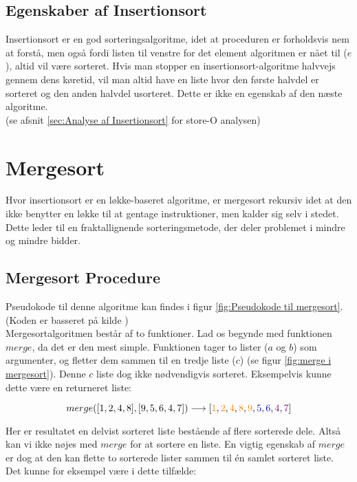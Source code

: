 \subsection{Egenskaber af Insertionsort}%
\label{sub:Egenskaber af Insertionsort}
Insertionsort er en god sorteringsalgoritme, idet at proceduren er forholdsvis nem at forstå, men også fordi listen til venstre for det element algoritmen er nået til ($e$), altid vil være sorteret. Hvis man stopper en insertionsort-algoritme halvvejs gennem dens køretid, vil man altid have en liste hvor den første halvdel er sorteret og den anden halvdel usorteret. Dette er ikke en egenskab af den næste algoritme.\\

(se afsnit \ref{sec:Analyse af Insertionsort} for store-O analysen)



\section{Mergesort}
\label{sec:Mergesort}

Hvor insertionsort er en løkke-baseret algoritme, er mergesort rekursiv idet at den ikke benytter en løkke til at gentage instruktioner, men kalder sig selv i stedet. Dette leder til en fraktallignende sorteringsmetode, der deler problemet i mindre og mindre bidder. 

\subsection{Mergesort Procedure}%
\label{sub:Mergesort Procedure}

Pseudokode til denne algoritme kan findes i figur \ref{fig:Pseudokode til mergesort}. (Koden er basseret på kilde \cite[s. 106]{aogd})\\

Mergesortalgoritmen består af to funktioner. Lad os begynde med funktionen $merge$, da det er den mest simple. Funktionen tager to lister ($a$ og $b$) som argumenter, og fletter dem sammen til en tredje liste ($c$) (se figur \ref{fig:merge i mergesort}). Denne $c$ liste dog ikke nødvendigvis sorteret. Eksempelvis kunne dette være en returneret liste:

$$merge([1,2,4,8],[9,5,6,4,7]) \longrightarrow [\color{orange}1\color{black}, \color{orange}2\color{black}, \color{orange}4\color{black}, \color{orange}8\color{black}, \color{orange}9\color{black}, \color{blue}5\color{black}, \color{blue}6\color{black}, \color{violet}4\color{black}, \color{violet}7\color{black}]$$

Her er resultatet en delvist sorteret liste bestående af flere sorterede dele. Altså kan vi ikke nøjes med $merge$ for at sortere en liste. En vigtig egenskab af $merge$ er dog at den kan flette to sorterede lister sammen til én samlet sorteret liste. Det kunne for eksempel være i dette tilfælde:

